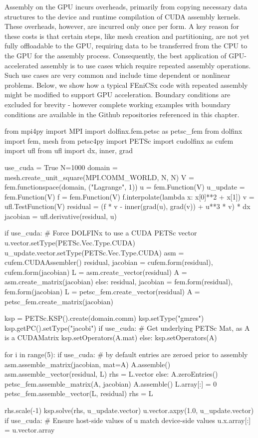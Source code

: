 Assembly on the GPU incurs overheads, primarily from copying necessary data structures to the device and runtime compilation of CUDA assembly kernels. These overheads, however, are incurred only once per form. A key reason for these costs is that certain steps, like mesh creation and partitioning, are not yet fully offloadable to the GPU, requiring data to be transferred from the CPU to the GPU for the assembly process. Consequently, the best application of GPU-accelerated assembly is to use cases which require repeated assembly operations. Such use cases are very common and include time dependent or nonlinear problems. Below, we show how a typical FEniCSx code with repeated assembly might be modified to support GPU acceleration. Boundary conditions are excluded for brevity - however complete working examples with boundary conditions are available in the Github repositories referenced in this chapter.

\begin{python}
from mpi4py import MPI
import dolfinx.fem.petsc as petsc_fem
from dolfinx import fem, mesh
from petsc4py import PETSc
import cudolfinx as cufem
import ufl
from ufl import dx, inner, grad

use_cuda = True
N=1000
domain = mesh.create_unit_square(MPI.COMM_WORLD, N, N)
V = fem.functionspace(domain, ("Lagrange", 1))
u = fem.Function(V)
u_update = fem.Function(V)
f = fem.Function(V)
f.interpolate(lambda x: x[0]**2 + x[1])
v = ufl.TestFunction(V)
residual = (f * v - inner(grad(u), grad(v)) + u**3 * v) * dx
jacobian = ufl.derivative(residual, u)

if use_cuda:
  # Force DOLFINx to use a CUDA PETSc vector
  u.vector.setType(PETSc.Vec.Type.CUDA)
  u_update.vector.setType(PETSc.Vec.Type.CUDA)
  asm = cufem.CUDAAssembler()
  residual, jacobian = cufem.form(residual), cufem.form(jacobian)
  L = asm.create_vector(residual)
  A = asm.create_matrix(jacobian)
else:
  residual, jacobian = fem.form(residual), fem.form(jacobian)
  L = petsc_fem.create_vector(residual)
  A = petsc_fem.create_matrix(jacobian)

ksp = PETSc.KSP().create(domain.comm)
ksp.setType("gmres")
ksp.getPC().setType("jacobi")
if use_cuda:
  # Get underlying PETSc Mat, as A is a CUDAMatrix
  ksp.setOperators(A.mat)
else:
  ksp.setOperators(A)

for i in range(5):
  if use_cuda:
    # by default entries are zeroed prior to assembly
    asm.assemble_matrix(jacobian, mat=A)
    A.assemble()
    asm.assemble_vector(residual, L)
    rhs = L.vector
  else:
    A.zeroEntries()
    petsc_fem.assemble_matrix(A, jacobian)
    A.assemble()
    L.array[:] = 0
    petsc_fem.assemble_vector(L, residual)
    rhs = L

  rhs.scale(-1)
  ksp.solve(rhs, u_update.vector)
  u.vector.axpy(1.0, u_update.vector)
  if use_cuda:
    # Ensure host-side values of u match device-side values
    u.x.array[:] = u.vector.array
\end{python}

